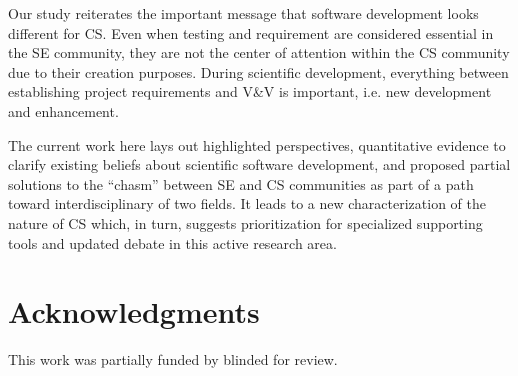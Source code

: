 \documentclass[sigconf,review,anonymous]{acmart}
\begin{document}
Our study reiterates the important message that software development looks different for CS. Even when testing and requirement are considered essential in the SE community, they are not the center of attention within the CS community due to their creation purposes. During scientific development, everything between establishing project requirements and V\&V is important, i.e. new development and enhancement. 

The current work here lays out highlighted perspectives, quantitative evidence to clarify existing beliefs about scientific software development, and proposed partial solutions to the ``chasm'' between SE and CS communities as part of a path toward interdisciplinary of two fields. It leads to a new characterization of the nature of CS which, in turn, suggests prioritization for specialized supporting tools and updated debate in this active research area.



\section{Acknowledgments}

This work was partially funded by 
blinded for review.

\balance


\end{document}
